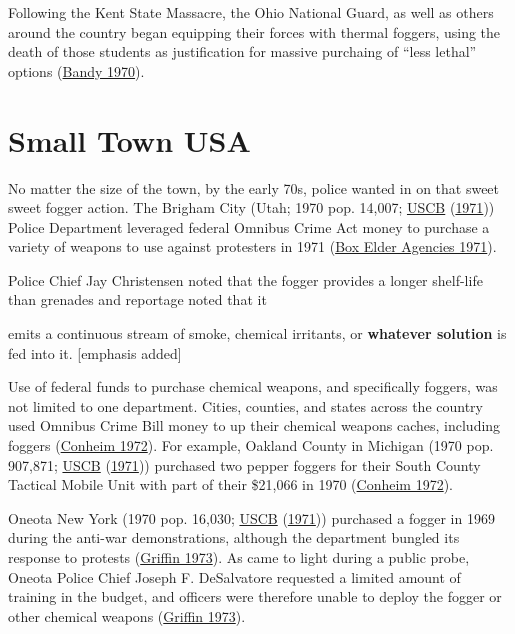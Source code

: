 \documentclass[
  11pt,
]{krantz}
\renewenvironment{quote}{\begin{VF}}{\end{VF}}
\begin{document}
Following the Kent State Massacre, the Ohio National Guard, as well as others around the country began equipping their forces with thermal foggers, using the death of those students as justification for massive purchaing of ``less lethal'' options (\protect\hyperlink{ref-Bandy1970}{Bandy 1970}).

\hypertarget{small-town-usa}{%
\section{Small Town USA}\label{small-town-usa}}

No matter the size of the town, by the early 70s, police wanted in on that sweet sweet fogger action.
The Brigham City (Utah; 1970 pop. 14,007; \protect\hyperlink{ref-USCB1970}{USCB} (\protect\hyperlink{ref-USCB1970}{1971})) Police Department leveraged federal Omnibus Crime Act money to purchase a variety of weapons to use against protesters in 1971 (\protect\hyperlink{ref-BoxElderAgencies1971}{Box Elder Agencies 1971}).

Police Chief Jay Christensen noted that the fogger provides a longer shelf-life than grenades and reportage noted that it

\begin{quote}
emits a continuous stream of smoke, chemical irritants, or \textbf{whatever solution} is fed into it. {[}emphasis added{]}

\end{quote}

Use of federal funds to purchase chemical weapons, and specifically foggers, was not limited to one department.
Cities, counties, and states across the country used Omnibus Crime Bill money to up their chemical weapons caches, including foggers (\protect\hyperlink{ref-Conheim1972}{Conheim 1972}).
For example, Oakland County in Michigan (1970 pop. 907,871; \protect\hyperlink{ref-USCB1970}{USCB} (\protect\hyperlink{ref-USCB1970}{1971})) purchased two pepper foggers for their South County Tactical Mobile Unit with part of their \$21,066 in 1970 (\protect\hyperlink{ref-Conheim1972}{Conheim 1972}).

Oneota New York (1970 pop. 16,030; \protect\hyperlink{ref-USCB1970}{USCB} (\protect\hyperlink{ref-USCB1970}{1971})) purchased a fogger in 1969 during the anti-war demonstrations, although the department bungled its response to protests (\protect\hyperlink{ref-Griffin1973}{Griffin 1973}).
As came to light during a public probe, Oneota Police Chief Joseph F. DeSalvatore requested a limited amount of training in the budget, and officers were therefore unable to deploy the fogger or other chemical weapons (\protect\hyperlink{ref-Griffin1973}{Griffin 1973}).
\end{document}
